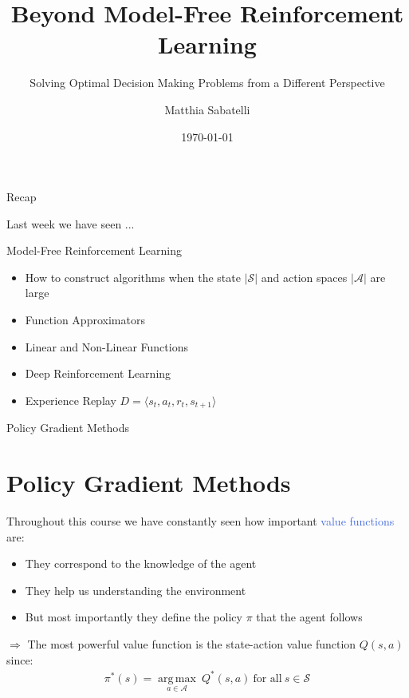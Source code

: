 \documentclass{beamer}
\title{Beyond Model-Free Reinforcement Learning}
\subtitle{Solving Optimal Decision Making Problems from a Different Perspective}
\author{Matthia Sabatelli}
\date{\today}
\DeclareMathOperator*{\argmax}{arg\,max}
\begin{document}
\frame{\titlepage} 

\begin{frame}{Recap}

	Last week we have seen ...
	\begin{block}{Model-Free Reinforcement Learning}
		\begin{itemize}
			\item How to construct algorithms when the state $|\mathcal{S}|$ and action spaces $|\mathcal{A}|$ are large
			\item Function Approximators
			\item Linear and Non-Linear Functions
			\item Deep Reinforcement Learning
			\item Experience Replay $D=\langle s_t, a_t, r_t, s_{t+1}\rangle$
		\end{itemize}
	\end{block}

\end{frame}





\begin{frame}{Policy Gradient Methods}
	\section{Policy Gradient Methods}
	Throughout this course we have constantly seen how important \textcolor{RoyalBlue}{value functions} are:
	\begin{itemize}
		\item They correspond to the knowledge of the agent
		\item They help us understanding the environment
		\item But most importantly they define the policy $\pi$ that the agent follows
	\end{itemize}

	\bigskip

	$\Rightarrow$ The most \textcolor{skymagenta}{powerful} value function is the state-action value function $Q(s,a)$ since:
	\begin{align*}
		\pi^{*}(s) = \underset{a\in\mathcal{A}}{\argmax} \ Q^{*}(s,a) \ \text{for all} \ s \in \mathcal{S}
	\end{align*}

\end{frame}
\end{document}
